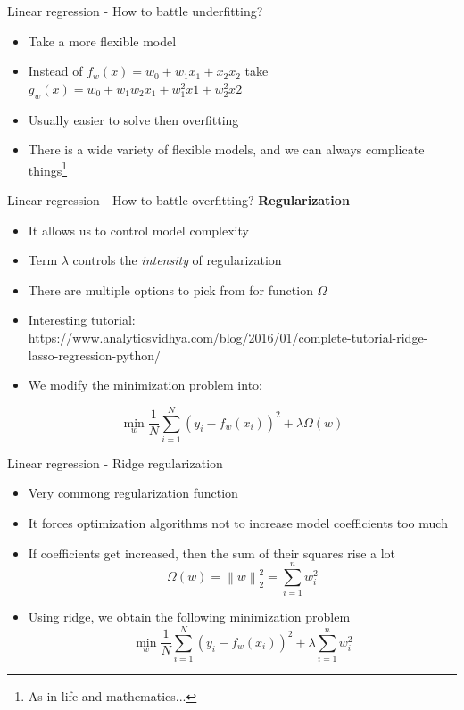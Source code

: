 \documentclass[aspectratio=169]{beamer}
\newcommand{\norm}[1]{\left\lVert#1\right\rVert}
\begin{document}
\begin{frame}{Linear regression - How to battle underfitting?}
    \begin{itemize}
        \item Take a more flexible model
        \item Instead of $f_w(x) = w_0 + w_1x_1 + x_2x_2$ take $g_w(x) = w_0 + w_1w_2x_1 + w_1^2x1 + w_2^2x2$
        \item Usually easier to solve then overfitting
        \item There is a wide variety of flexible models, and we can always complicate things\footnote{As in life and mathematics...}
    \end{itemize}
\end{frame}
\begin{frame}{Linear regression - How to battle overfitting?}
    \textbf{Regularization}
    \begin{itemize}
        \item It allows us to control model complexity
        \item Term $\lambda$ controls the \textit{intensity} of regularization
        \item There are multiple options to pick from for function $\Omega$
        \item Interesting tutorial: https://www.analyticsvidhya.com/blog/2016/01/complete-tutorial-ridge-lasso-regression-python/
        \item We modify the minimization problem into:
    \end{itemize}
    $$ \min_w \frac{1}{N} \sum_{i=1}^{N} (y_i - f_w(x_i))^ 2 + \lambda \Omega(w) $$
\end{frame}
\begin{frame}{Linear regression - Ridge regularization}
    \begin{itemize}
        \item Very commong regularization function
        \item It forces optimization algorithms not to increase model coefficients too much
        \item If coefficients get increased, then the sum of their squares rise a lot
        $$ \Omega(w) = \norm{w}_2^2 = \sum_{i=1}^{n}w_i^2 $$
    \item Using ridge, we obtain the following minimization problem
    $$ \min_w \frac{1}{N} \sum_{i=1}^{N} (y_i - f_w(x_i))^ 2 + \lambda \sum_{i=1}^{n}w_i^2 $$
    \end{itemize} 
\end{frame}
\end{document}
